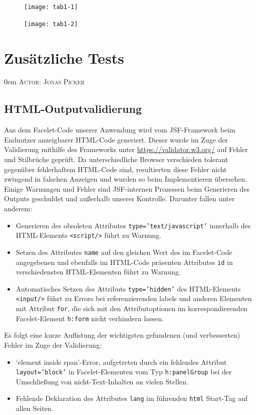 \documentclass{article}
\makeatletter
\newcommand{\sectionauthor}[1]{
	{\parindent 0em \large \scshape Autor: #1 \par \nobreak \vspace*{1em}}
	\@afterheading
}
\makeatother
\begin{document}
{
\begin{figure}[h]
    \centering
    \texttt{[image: tab1-1]}
\end{figure}
\restoregeometry

\newpage

\begin{figure}[h]
    \centering
    \texttt{[image: tab1-2]}
\end{figure}
\restoregeometry}

\newpage

\section{Zusätzliche Tests}
\sectionauthor{Jonas Picker}
\subsection{HTML-Outputvalidierung}
Aus dem Facelet-Code unserer Anwendung wird vom JSF-Framework beim Endnutzer anzeigbarer HTML-Code generiert. Dieser wurde im Zuge der Validierung mithilfe des Frameworks unter  \url{https://validator.w3.org/} auf Fehler und Stilbrüche geprüft. Da unterschiedliche Browser verschieden tolerant gegenüber fehlerhaftem HTML-Code sind, resultierten diese Fehler nicht zwingend in falschen Anzeigen und wurden so beim Implementieren übersehen. Einige Warnungen und Fehler sind JSF-internen Prozessen beim Generieren des Outputs geschuldet und außerhalb unserer Kontrolle. Darunter fallen unter anderem:
\begin{itemize}
\item Generieren des obsoleten Attributes \texttt{type='text/javascript'} innerhalb des HTML-Elements \texttt{<script/>} führt zu Warnung.
\item Setzen des Attributes \texttt{name} auf den gleichen Wert des im Facelet-Code angegebenen und ebenfalls im HTML-Code präsenten Attributes \texttt{id} in verschiedensten HTML-Elementen führt zu Warnung.
\item Automatisches Setzen des Attributs \texttt{type='hidden'} des HTML-Elements \texttt{<input/>} führt zu Errors bei referenzierenden labels und anderen Elementen mit Attribut \texttt{for}, die sich mit den Attributoptionen im korrespondierenden Facelet-Element \texttt{h:form} nicht verhindern lassen.
\end{itemize}
Es folgt eine kurze Auflistung der wichtigsten gefundenen (und verbesserten) Fehler im Zuge der Validierung:
\begin{itemize}
\item `element inside span'-Error, aufgetreten durch ein fehlendes Attribut \texttt{layout='block'} in Facelet-Elementen vom Typ \texttt{h:panelGroup} bei der Umschließung von nicht-Text-Inhalten an vielen Stellen.
\item Fehlende Deklaration des Attributes \texttt{lang} im führenden \texttt{html} Start-Tag auf allen Seiten.
\end{itemize}
\end{document}
